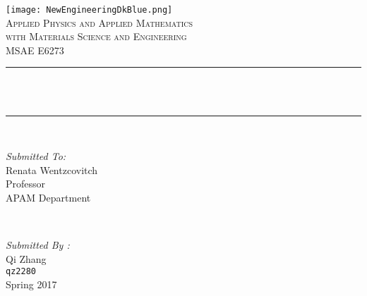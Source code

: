 
\begin{titlepage}
	\centering
	\vspace*{0.5 cm}
	\texttt{[image: NewEngineeringDkBlue.png]}\\[1.0 cm]	%
	\textsc{\Large Applied Physics and Applied Mathematics\\
		\large with Materials Science and Engineering}\\[2.0 cm]	%
	\textsc{\Large MSAE E6273}\\[0.5 cm]				%
	\rule{\linewidth}{0.2 mm} \\[0.4 cm]
	{ \huge \bfseries \thetitle}\\
	\rule{\linewidth}{0.2 mm} \\[1.5 cm]

	\begin{minipage}{0.4\textwidth}
		\begin{flushleft} \large
			\emph{Submitted To:}\\
			Renata Wentzcovitch\\
			Professor\\
			APAM Department\\
		\end{flushleft}
	\end{minipage}~
	\begin{minipage}{0.4\textwidth}

		\begin{flushright} \large
			\emph{Submitted By :} \\
			Qi Zhang\\
			\texttt{qz2280}\\
			Spring 2017\\
		\end{flushright}

	\end{minipage}\\[2 cm]
\end{titlepage}

